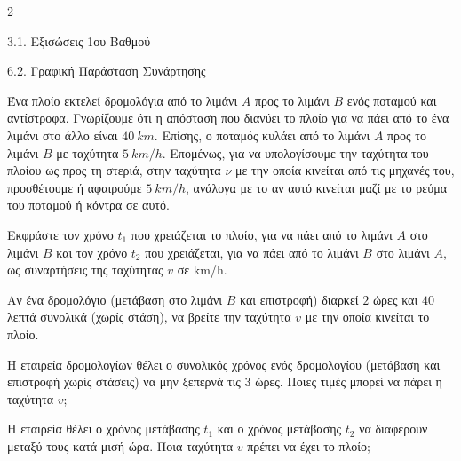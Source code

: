 \begin{ylh}{2}
    \item 3.1. Εξισώσεις 1ου Βαθμού
    \item 6.2. Γραφική Παράσταση Συνάρτησης
\end{ylh}

Ένα πλοίο εκτελεί δρομολόγια από το λιμάνι $A$ προς το λιμάνι $B$ ενός ποταμού και αντίστροφα. Γνωρίζουμε ότι η απόσταση που διανύει το πλοίο για να πάει από το ένα λιμάνι στο άλλο είναι $40\ km$. Επίσης, ο ποταμός κυλάει από το λιμάνι $A$ προς το λιμάνι $B$ με ταχύτητα $5\ km/h$. Επομένως, για να υπολογίσουμε την ταχύτητα του πλοίου ως προς τη στεριά, στην ταχύτητα $\nu$ με την οποία κινείται από τις μηχανές του, προσθέτουμε ή αφαιρούμε $5\ km/h$, ανάλογα με το αν αυτό κινείται μαζί με το ρεύμα του ποταμού ή κόντρα σε αυτό.

\begin{center}

\end{center}

\begin{alist}
\item Εκφράστε τον χρόνο $t_1$ που χρειάζεται το πλοίο, για να πάει από το λιμάνι $A$ στο λιμάνι $B$ και τον χρόνο $t_2$ που χρειάζεται, για να πάει από το λιμάνι $B$ στο λιμάνι $A$, ως συναρτήσεις της ταχύτητας $v$ σε km/h.
\item Αν ένα δρομολόγιο (μετάβαση στο λιμάνι $B$ και επιστροφή) διαρκεί $2$ ώρες και $40$ λεπτά συνολικά (χωρίς στάση), να βρείτε την ταχύτητα $v$ με την οποία κινείται το πλοίο.
\item Η εταιρεία δρομολογίων θέλει ο συνολικός χρόνος ενός δρομολογίου (μετάβαση και επιστροφή χωρίς στάσεις) να μην ξεπερνά τις $3$ ώρες. Ποιες τιμές μπορεί να πάρει η ταχύτητα $v$;
\item Η εταιρεία θέλει ο χρόνος μετάβασης $t_1$ και ο χρόνος μετάβασης $t_2$ να διαφέρουν μεταξύ τους κατά μισή ώρα. Ποια ταχύτητα $v$ πρέπει να έχει το πλοίο;
\end{alist}

